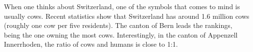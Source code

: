 When one thinks about Switzerland, one of the symbols that comes to mind is usually cows.
Recent statistics show that Switzerland has around 1.6 million cows (roughly one cow per five residents).
The canton of Bern leads the rankings, being the one owning the most cows.
Interestingly, in the canton of Appenzell Innerrhoden, the ratio of cows and humans is close to 1:1.